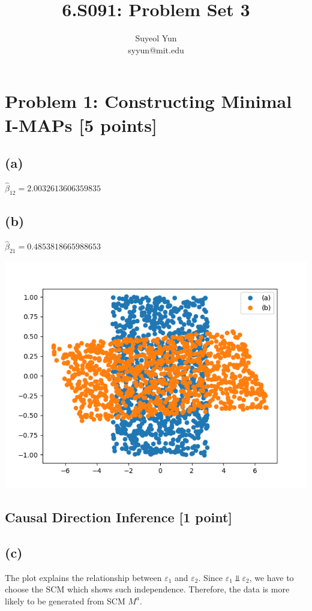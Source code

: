 \documentclass[10pt]{article}
\begin{document}
 
\title{6.S091: Problem Set 3}
\author{Suyeol Yun\\
syyun@mit.edu}
\maketitle
 
\section{Problem 1: Constructing Minimal I-MAPs [5 points]}

\subsection{(a)} $\hat{\beta}_{12} = 2.0032613606359835$
\subsection{(b)} $\hat{\beta}_{21} = 0.4853818665988653$

\includegraphics{images/problem1.png}

\subsection{Causal Direction Inference [1 point]}

\subsection{(c)}
The plot explains the relationship between $\varepsilon_1$ and $\varepsilon_2$. Since $\varepsilon_1 \Perp \varepsilon_2$, we have to choose the SCM which shows such independence. Therefore, the data is more likely to be generated from SCM $M^a$.
\end{document}
